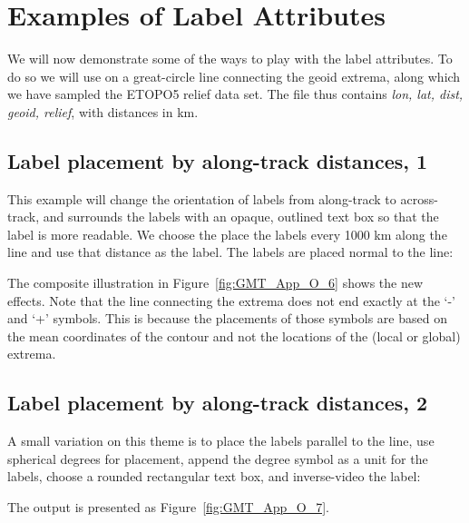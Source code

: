 \section{Examples of Label Attributes}

We will now demonstrate some of the ways to play with the label attributes.  To do so we
will use  on a great-circle line connecting the geoid extrema, along which
we have sampled the ETOPO5 relief data set.  The file  thus contains
\emph{lon, lat, dist, geoid, relief}, with distances in km.

\subsection{Label placement by along-track distances, 1}

This example will change the orientation of labels from along-track to across-track, and
surrounds the labels with an opaque, outlined text box so that the label is more readable.  We choose
the place the labels every 1000 km along the line and use that distance as the label.  The
labels are placed normal to the line:



\noindent
The composite illustration in Figure~\ref{fig:GMT_App_O_6} shows the new effects.  Note that
the line connecting the extrema does not end exactly at the `-' and `+' symbols.  This is
because the placements of those symbols are based on the mean coordinates of the contour and
not the locations of the (local or global) extrema.

\subsection{Label placement by along-track distances, 2}

A small variation on this theme is to place the labels parallel to the line, use
spherical degrees for placement, append the degree symbol as a unit for the
labels, choose a rounded rectangular text box, and inverse-video the label:


\noindent
The output is presented as Figure~\ref{fig:GMT_App_O_7}.


